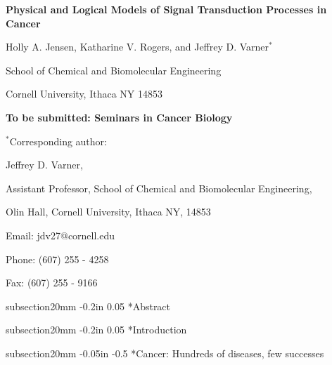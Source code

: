 \documentclass[12pt]{article}
\makeatletter
\renewcommand\subsection{\@startsection
	{subsection}{2}{0mm}
	{-0.05in}
	{-0.5\baselineskip}
	{\normalfont\normalsize\bfseries}}
\renewcommand\section{\@startsection
	{subsection}{2}{0mm}
	{-0.2in}
	{0.05\baselineskip}
	{\normalfont\large\bfseries}}
\makeatother
\begin{document}
\begin{titlepage}
{\par\centering\textbf{\Large Physical and Logical Models of Signal Transduction Processes in Cancer }}
\vspace{0.05in}
{\par \centering \large{ Holly A. Jensen, Katharine V. Rogers, and Jeffrey D. Varner$^{*}$}}
\vspace{0.05in}
{\par \centering \large{School of Chemical and Biomolecular Engineering}}
{\par \centering \large{Cornell University, Ithaca NY 14853}}
\vspace{0.1in}
{\par \centering \textbf{To be submitted: Seminars in Cancer Biology}~\emph{}}
\vspace{0.5in}
{\par \centering $^{*}$Corresponding author:}
{\par \centering Jeffrey D. Varner,}
{\par \centering Assistant Professor, School of Chemical and Biomolecular Engineering,}
{\par {} Olin Hall, Cornell University, Ithaca NY, 14853} 
{\par \centering Email: jdv27@cornell.edu} 
{\par \centering Phone: (607) 255 - 4258}
{\par \centering Fax: (607) 255 - 9166}
\end{titlepage}
\date{}
\thispagestyle{empty}
\pagebreak
\section*{Abstract}


\pagebreak

\setcounter{page}{1}

\linenumbers

\section*{Introduction}

\subsection*{Cancer: Hundreds of diseases, few successes} 
\end{document}

